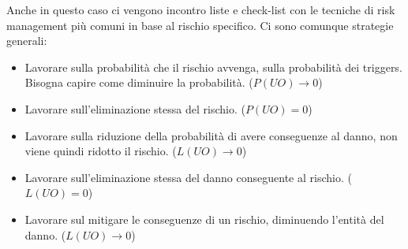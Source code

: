 Anche in questo caso ci vengono incontro liste e check-list con le tecniche di risk
management più comuni in base al rischio specifico. Ci sono comunque strategie generali:
\begin{itemize}
    \item Lavorare sulla probabilità che il rischio avvenga, sulla probabilità dei
          triggers. Bisogna capire come diminuire la probabilità. ($P(UO)\rightarrow 0$)
    \item Lavorare sull'eliminazione stessa del rischio. ($P(UO)= 0$)
    \item Lavorare sulla riduzione della probabilità di avere conseguenze al danno,
          non viene quindi ridotto il rischio. ($L(UO)\rightarrow 0$)
    \item Lavorare sull'eliminazione stessa del danno conseguente al rischio. ($L(UO)= 0$)
    \item Lavorare sul mitigare le conseguenze di un rischio, diminuendo l'entità
          del danno. ($L(UO)\rightarrow 0$)
\end{itemize}

